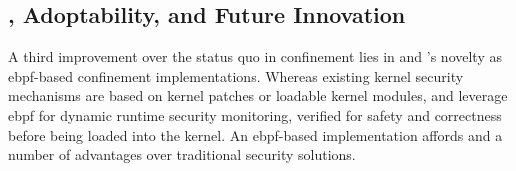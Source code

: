 

\subsection{, Adoptability, and Future Innovation}

A third improvement over the status quo in confinement lies in \bpfbox{} and
\bpfcontain{}'s novelty as \gls{ebpf}-based confinement implementations. Whereas existing
kernel security mechanisms are based on kernel patches or loadable kernel modules,
\bpfbox{} and \bpfcontain{} leverage \gls{ebpf} for dynamic runtime security monitoring,
verified for safety and correctness before being loaded into the kernel. An
\gls{ebpf}-based implementation affords \bpfbox{} and \bpfcontain{} a number of advantages
over traditional security solutions.

